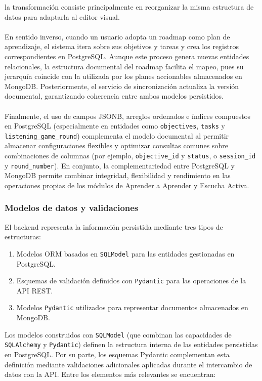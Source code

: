 la transformación consiste principalmente en reorganizar la misma estructura de datos para
adaptarla al editor visual.
\\
\\
En sentido inverso, cuando un usuario adopta un roadmap como plan de aprendizaje, el sistema
itera sobre sus objetivos y tareas y crea los registros correspondientes en PostgreSQL. Aunque este
proceso genera nuevas entidades relacionales, la estructura documental del roadmap facilita el
mapeo, pues su jerarquía coincide con la utilizada por los planes accionables almacenados en
MongoDB. Posteriormente, el servicio de sincronización actualiza la versión documental,
garantizando coherencia entre ambos modelos persistidos.
\\
\\
Finalmente, el uso de campos JSONB, arreglos ordenados e índices compuestos en PostgreSQL
(especialmente en entidades como \texttt{objectives}, \texttt{tasks} y \texttt{listening\_game\_round})
complementa el modelo documental al permitir almacenar configuraciones flexibles y optimizar
consultas comunes sobre combinaciones de columnas (por ejemplo, \texttt{objective\_id} y
\texttt{status}, o \texttt{session\_id} y \texttt{round\_number}). En conjunto, la complementariedad entre
PostgreSQL y MongoDB permite combinar integridad, flexibilidad y rendimiento en las operaciones
propias de los módulos de Aprender a Aprender y Escucha Activa.


\subsubsection{Modelos de datos y validaciones}

El backend representa la información persistida mediante tres tipos de estructuras:
\begin{enumerate}[label=(\roman*), leftmargin=*]
    \item Modelos ORM basados en \texttt{SQLModel} para las entidades gestionadas en PostgreSQL.
    \item Esquemas de validación definidos con \texttt{Pydantic} para las operaciones de la API REST. 
    \item Modelos \texttt{Pydantic} utilizados para representar documentos almacenados en MongoDB.
\end{enumerate}
Los modelos construidos con \texttt{SQLModel} (que combinan las capacidades de 
\texttt{SQLAlchemy} y \texttt{Pydantic}) definen la estructura interna de las entidades 
persistidas en PostgreSQL. Por su parte, los esquemas Pydantic complementan esta 
definición mediante validaciones adicionales aplicadas durante el intercambio de datos 
con la API. Entre los elementos más relevantes se encuentran:

